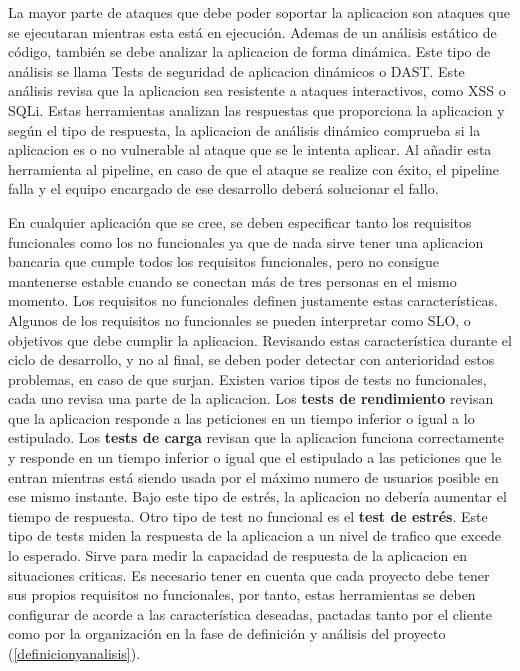 \documentclass[12pt]{report} %
\begin{document}
La mayor parte de ataques que debe poder soportar la aplicacion son ataques que
se ejecutaran mientras esta está en ejecución.
Ademas de un análisis estático de código, también se debe analizar la aplicacion
de forma dinámica.
Este tipo de análisis se llama Tests de seguridad de aplicacion
dinámicos o \gls{DAST}.
Este análisis revisa que la aplicacion sea resistente a ataques interactivos,
como \gls{XSS} o \gls{SQLi}.
Estas herramientas analizan las respuestas que proporciona la aplicacion y
según el tipo de respuesta, la aplicacion de análisis dinámico comprueba si la
aplicacion es o no vulnerable al ataque que se le intenta aplicar.
Al añadir esta herramienta al \gls{pipeline}, en caso de que el ataque se
realize con éxito, el \gls{pipeline} falla y el equipo encargado de ese
desarrollo deberá solucionar el fallo.

En cualquier aplicación que se cree, se deben especificar tanto los requisitos
funcionales como los no funcionales ya que de nada sirve tener una aplicacion
bancaria que cumple todos los requisitos funcionales, pero no consigue
mantenerse estable cuando se conectan más de tres personas en el mismo momento.
Los requisitos no funcionales definen justamente estas características.
Algunos de los requisitos no funcionales se pueden interpretar como
\acrfull{SLO}, o objetivos que debe cumplir la aplicacion.
Revisando estas característica durante el ciclo de desarrollo, y no al final, se
deben poder detectar con anterioridad estos problemas, en caso de que surjan.
Existen varios tipos de tests no funcionales, cada uno revisa una parte de la
aplicacion.
Los \textbf{tests de rendimiento} revisan que la aplicacion responde a las peticiones en
un tiempo inferior o igual a lo estipulado.
Los \textbf{tests de carga} revisan que la aplicacion funciona correctamente y responde en
un tiempo inferior o igual que el estipulado a las peticiones que le entran
mientras está siendo usada por el máximo numero de usuarios posible en ese mismo
instante. Bajo este tipo de estrés, la aplicacion no debería aumentar el tiempo
de respuesta.
Otro tipo de test no funcional es el \textbf{test de estrés}.
Este tipo de tests miden la respuesta de la aplicacion a un nivel de trafico que
excede lo esperado. Sirve para medir la capacidad de respuesta de la aplicacion
en situaciones criticas.
Es necesario tener en cuenta que cada proyecto debe tener sus propios requisitos no
funcionales, por tanto, estas herramientas se deben configurar de acorde a las
característica deseadas, pactadas tanto por el cliente como por la organización
en la fase de definición y análisis del proyecto (\ref{definicionyanalisis}).
\end{document}
